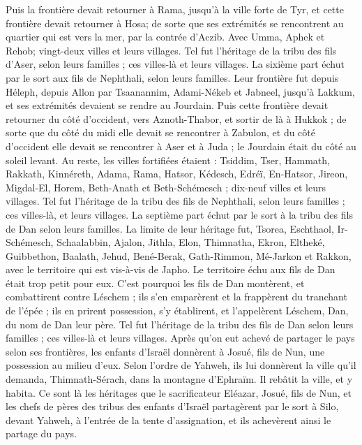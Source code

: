 \begin{multicols}{2}
Puis la frontière devait retourner à Rama, jusqu'à la ville forte de Tyr, et cette frontière devait retourner à Hosa; de sorte que ses extrémités se rencontrent au quartier qui est vers la mer, par la contrée d'Aczib.
Avec Umma, Aphek et Rehob; vingt-deux villes et leurs villages.
Tel fut l'héritage de la tribu des fils d'Aser, selon leurs familles ; ces villes-là et leurs villages.
La sixième part échut par le sort aux fils de Nephthali, selon leurs familles.
Leur frontière fut depuis Héleph, depuis Allon par Tsaanannim, Adami-Nékeb et Jabneel, jusqu'à Lakkum, et ses extrémités devaient se rendre au Jourdain.
Puis cette frontière devait retourner du côté d'occident, vers Aznoth-Thabor, et sortir de là à Hukkok ; de sorte que du côté du midi elle devait se rencontrer à Zabulon, et du côté d'occident elle devait se rencontrer à Aser et à Juda ; le Jourdain était du côté au soleil levant.
Au reste, les villes fortifiées étaient : Tsiddim, Tser, Hammath, Rakkath, Kinnéreth,
Adama, Rama, Hatsor,
Kédesch, Edréï, En-Hatsor,
Jireon, Migdal-El, Horem, Beth-Anath et Beth-Schémesch ; dix-neuf villes et leurs villages.
Tel fut l'héritage de la tribu des fils de Nephthali, selon leurs familles ; ces villes-là, et leurs villages.
La septième part échut par le sort à la tribu des fils de Dan selon leurs familles.
La limite de leur héritage fut, Tsorea, Eschthaol, Ir-Schémesch,
Schaalabbin, Ajalon, Jithla,
Elon, Thimnatha, Ekron,
Eltheké, Guibbethon, Baalath,
Jehud, Bené-Berak, Gath-Rimmon,
Mé-Jarkon et Rakkon, avec le territoire qui est vis-à-vis de Japho.
Le territoire échu aux fils de Dan était trop petit pour eux. C'est pourquoi les fils de Dan montèrent, et combattirent contre Léschem ; ils s'en emparèrent et la frappèrent du tranchant de l'épée ; ils en prirent possession, s'y établirent, et l'appelèrent Léschem, Dan, du nom de Dan leur père.
Tel fut l'héritage de la tribu des fils de Dan selon leurs familles ; ces villes-là et leurs villages.
Après qu'on eut achevé de partager le pays selon ses frontières, les enfants d'Israël donnèrent à Josué, fils de Nun, une possession au milieu d'eux.
Selon l'ordre de Yahweh, ils lui donnèrent la ville qu'il demanda, Thimnath-Sérach, dans la montagne d'Ephraïm. Il rebâtit la ville, et y habita.
Ce sont là les héritages que le sacrificateur Eléazar, Josué, fils de Nun, et les chefs de pères des tribus des enfants d'Israël partagèrent par le sort à Silo, devant Yahweh, à l'entrée de la tente d'assignation, et ils achevèrent ainsi le partage du pays.

\end{multicols}
